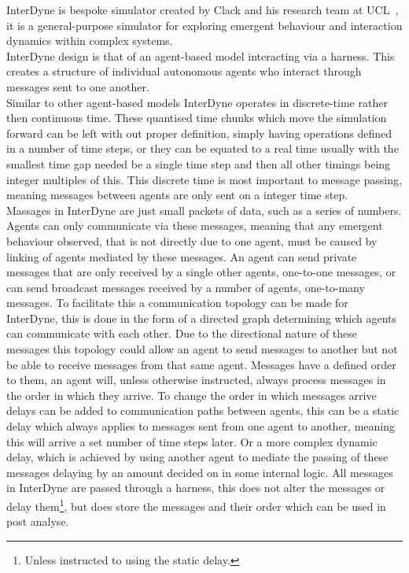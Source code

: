 \documentclass{article}
\begin{document}




InterDyne is bespoke simulator created by Clack and his research team at UCL~\cite{Chris_webPage}, it is a general-purpose simulator for exploring emergent behaviour and interaction dynamics within complex systems.\\
InterDyne design is that of an agent-based model interacting via a harness. This creates a structure of individual autonomous agents who interact through messages sent to one another.\\ 
Similar to other agent-based models InterDyne operates in discrete-time rather then continuous time. These quantised time chunks which move the simulation forward can be left with out proper definition, simply having operations defined in a number of time steps, or they can be equated to a real time usually with the smallest time gap needed be a single time step and then all other timings being integer multiples of this. This discrete time is most important to message passing, meaning messages between agents are only sent on a integer time step.\\ 
Massages in InterDyne are just small packets of data, such as a series of numbers.  Agents can only communicate via these messages, meaning that any emergent behaviour observed, that is not directly due to one agent, must be caused by linking of agents mediated by these messages. An agent can send private messages that are only received by a single other agents, one-to-one messages, or can send broadcast messages received by a number of agents, one-to-many messages. To facilitate this a communication topology can be made for InterDyne, this is done in the form of a directed graph determining which agents can communicate with each other. Due to the directional nature of these messages this topology could allow an agent to send messages to another but not be able to receive messages from that same agent. Messages have a defined order to them, an agent will, unless otherwise instructed, always process messages in the order in which they arrive. To change the order in which messages arrive delays can be added to communication paths between agents, this can be a static delay which always applies to messages sent from one agent to another, meaning this will arrive a set number of time steps later. Or a more complex dynamic delay, which is achieved by using another agent to mediate the passing of these messages delaying by an amount decided on in some internal logic. All messages in InterDyne are passed through a harness, this does not alter the messages or delay them\footnote{Unless instructed to using the static delay.}, but does store the messages and their order which can be used in post analyse.\\         
\end{document}
